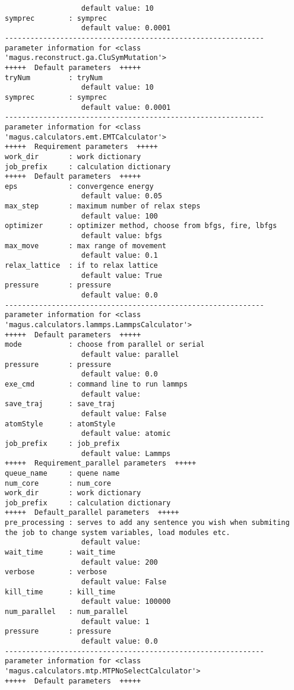 \documentclass[12pt,oneside]{book}
\begin{document}
\begin{tcolorbox}
\begin{verbatim}
                  default value: 10
symprec        : symprec
                  default value: 0.0001
-------------------------------------------------------------
parameter information for <class 'magus.reconstruct.ga.CluSymMutation'>
+++++  Default parameters  +++++
tryNum         : tryNum
                  default value: 10
symprec        : symprec
                  default value: 0.0001
-------------------------------------------------------------
parameter information for <class 'magus.calculators.emt.EMTCalculator'>
+++++  Requirement parameters  +++++
work_dir       : work dictionary
job_prefix     : calculation dictionary
+++++  Default parameters  +++++
eps            : convergence energy
                  default value: 0.05
max_step       : maximum number of relax steps
                  default value: 100
optimizer      : optimizer method, choose from bfgs, fire, lbfgs
                  default value: bfgs
max_move       : max range of movement
                  default value: 0.1
relax_lattice  : if to relax lattice
                  default value: True
pressure       : pressure
                  default value: 0.0
-------------------------------------------------------------
parameter information for <class 'magus.calculators.lammps.LammpsCalculator'>
+++++  Default parameters  +++++
mode           : choose from parallel or serial
                  default value: parallel
pressure       : pressure
                  default value: 0.0
exe_cmd        : command line to run lammps
                  default value: 
save_traj      : save_traj
                  default value: False
atomStyle      : atomStyle
                  default value: atomic
job_prefix     : job_prefix
                  default value: Lammps
+++++  Requirement_parallel parameters  +++++
queue_name     : quene name
num_core       : num_core
work_dir       : work dictionary
job_prefix     : calculation dictionary
+++++  Default_parallel parameters  +++++
pre_processing : serves to add any sentence you wish when submiting the job to change system variables, load modules etc.
                  default value: 
wait_time      : wait_time
                  default value: 200
verbose        : verbose
                  default value: False
kill_time      : kill_time
                  default value: 100000
num_parallel   : num_parallel
                  default value: 1
pressure       : pressure
                  default value: 0.0
-------------------------------------------------------------
parameter information for <class 'magus.calculators.mtp.MTPNoSelectCalculator'>
+++++  Default parameters  +++++

\end{verbatim}
\end{tcolorbox}
\end{document}
